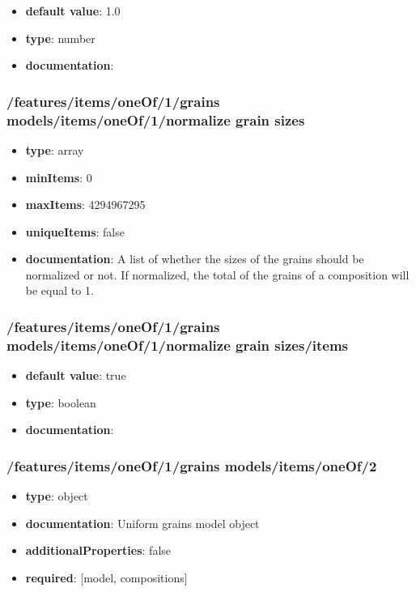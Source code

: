 \begin{itemize}\item {\bf default value}: 1.0
\item {\bf type}: number
\item {\bf documentation}: 
\end{itemize}\subsubsection{/features/items/oneOf/1/grains models/items/oneOf/1/normalize grain sizes}
\begin{itemize}\item {\bf type}: array
\item {\bf minItems}: 0
\item {\bf maxItems}: 4294967295
\item {\bf uniqueItems}: false
\item {\bf documentation}: A list of whether the sizes of the grains should be normalized or not. If normalized, the total of the grains of a composition will be equal to 1.
\end{itemize}\subsubsection{/features/items/oneOf/1/grains models/items/oneOf/1/normalize grain sizes/items}
\begin{itemize}\item {\bf default value}: true
\item {\bf type}: boolean
\item {\bf documentation}: 
\end{itemize}\subsubsection{/features/items/oneOf/1/grains models/items/oneOf/2}
\begin{itemize}\item {\bf type}: object
\item {\bf documentation}: Uniform grains model object
\item {\bf additionalProperties}: false
\item {\bf required}: [model, compositions]\end{itemize}
